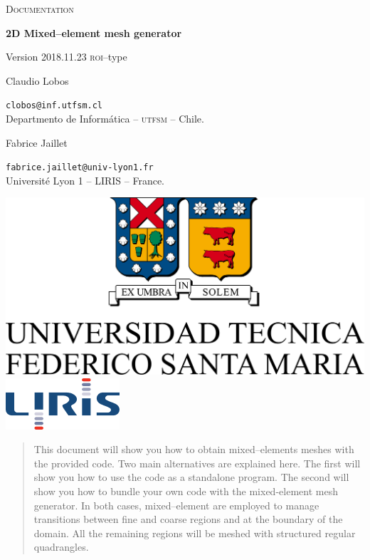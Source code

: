 \documentclass[10pt]{article}
\begin{document}
\begin{minipage}{0.7\textwidth}

{\LARGE \textsc{Documentation}}

{\Large \textbf{2D Mixed--element mesh generator}

{\large Version 2018.11.23 \textsc{roi}--type}}

{\large Claudio Lobos}

\small \texttt{clobos@inf.utfsm.cl}\\
\small Departmento de Inform\'atica -- \textsc{utfsm}  -- Chile.

{\large Fabrice Jaillet}

\small \texttt{fabrice.jaillet@univ-lyon1.fr}\\
\small Universit\'e Lyon 1 -- \textsc{LIRIS}  -- France.
\end{minipage}
\hfill
\begin{minipage}{0.28\textwidth}
\includegraphics[width=\textwidth]{utfsm-all-oc.pdf}
\includegraphics[width=\textwidth]{logo_liris_160_0.png}
\end{minipage}

\vspace{0.5cm}

\begin{abstract}
This document will show you how to obtain mixed--elements meshes with the provided code. Two main alternatives are explained here. The first will show you how to use the code as a standalone program. The second will show you how to bundle your own code with the mixed-element mesh generator. In both cases, mixed--element are employed to manage transitions between fine and coarse regions and at the boundary of the domain. All the remaining regions will be meshed with structured regular quadrangles.
\end{abstract}
\end{document}
